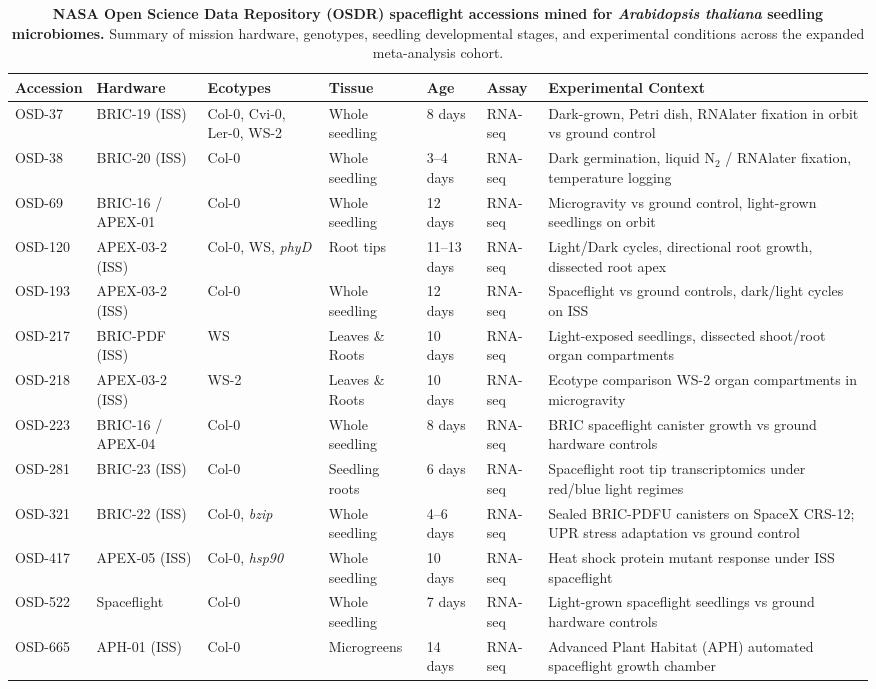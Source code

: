 \begin{table}[t]
\centering
\small
\caption{\textbf{NASA Open Science Data Repository (OSDR) spaceflight accessions mined for \textit{Arabidopsis thaliana} seedling microbiomes.} Summary of mission hardware, genotypes, seedling developmental stages, and experimental conditions across the expanded meta-analysis cohort.}
\label{tab:datasets}
\begin{tabularx}{\textwidth}{@{}l p{2.2cm} p{2.2cm} p{2.0cm} l l X@{}}
\toprule
\textbf{Accession} & \textbf{Hardware} & \textbf{Ecotypes} & \textbf{Tissue} & \textbf{Age} & \textbf{Assay} & \textbf{Experimental Context} \\
\midrule
OSD-37 & BRIC-19 (ISS) & Col-0, Cvi-0, Ler-0, WS-2 & Whole seedling & 8 days & RNA-seq & Dark-grown, Petri dish, RNAlater fixation in orbit vs ground control \\
OSD-38 & BRIC-20 (ISS) & Col-0 & Whole seedling & 3--4 days & RNA-seq & Dark germination, liquid N$_2$ / RNAlater fixation, temperature logging \\
OSD-69 & BRIC-16 / APEX-01 & Col-0 & Whole seedling & 12 days & RNA-seq & Microgravity vs ground control, light-grown seedlings on orbit \\
OSD-120 & APEX-03-2 (ISS) & Col-0, WS, \textit{phyD} & Root tips & 11--13 days & RNA-seq & Light/Dark cycles, directional root growth, dissected root apex \\
OSD-193 & APEX-03-2 (ISS) & Col-0 & Whole seedling & 12 days & RNA-seq & Spaceflight vs ground controls, dark/light cycles on ISS \\
OSD-217 & BRIC-PDF (ISS) & WS & Leaves \& Roots & 10 days & RNA-seq & Light-exposed seedlings, dissected shoot/root organ compartments \\
OSD-218 & APEX-03-2 (ISS) & WS-2 & Leaves \& Roots & 10 days & RNA-seq & Ecotype comparison WS-2 organ compartments in microgravity \\
OSD-223 & BRIC-16 / APEX-04 & Col-0 & Whole seedling & 8 days & RNA-seq & BRIC spaceflight canister growth vs ground hardware controls \\
OSD-281 & BRIC-23 (ISS) & Col-0 & Seedling roots & 6 days & RNA-seq & Spaceflight root tip transcriptomics under red/blue light regimes \\
OSD-321 & BRIC-22 (ISS) & Col-0, \textit{bzip} & Whole seedling & 4--6 days & RNA-seq & Sealed BRIC-PDFU canisters on SpaceX CRS-12; UPR stress adaptation vs ground control \\
OSD-417 & APEX-05 (ISS) & Col-0, \textit{hsp90} & Whole seedling & 10 days & RNA-seq & Heat shock protein mutant response under ISS spaceflight \\
OSD-522 & Spaceflight & Col-0 & Whole seedling & 7 days & RNA-seq & Light-grown spaceflight seedlings vs ground hardware controls \\
OSD-665 & APH-01 (ISS) & Col-0 & Microgreens & 14 days & RNA-seq & Advanced Plant Habitat (APH) automated spaceflight growth chamber \\
\bottomrule
\end{tabularx}
\end{table}
